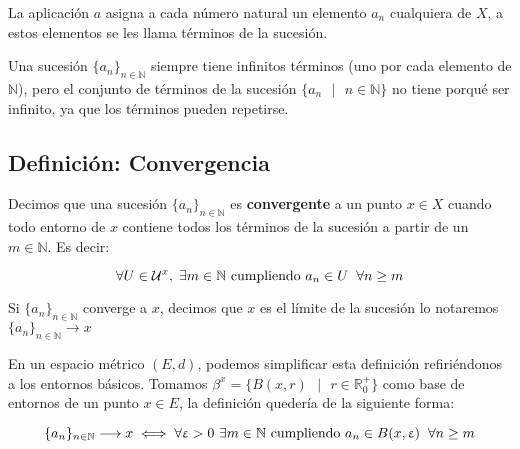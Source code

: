 \documentclass{article}
\begin{document}
\begin{justify} La aplicación $a$ asigna a cada número natural un
  elemento $a_n$ cualquiera de $X$, a estos elementos se les llama
  términos de la sucesión.
\end{justify}

\begin{justify} Una sucesión $\{a_n\}_{n \in \mathbb{N}}$ siempre
  tiene infinitos términos (uno por cada elemento de $\mathbb{N}$),
  pero el conjunto de términos de la sucesión
  $\{a_n \text{ } | \text{ } n \in \mathbb{N}\}$ no tiene porqué ser
  infinito, ya que los términos pueden repetirse.
\end{justify}

\subsection*{Definición: Convergencia}

\begin{justify} Decimos que una sucesión $\{a_n\}_{n \in \mathbb{N}}$
  es \textbf{convergente} a un punto $x \in X$ cuando todo entorno de
  $x$ contiene todos los términos de la sucesión a partir de un
  $m \in \mathbb{N}$. Es decir: \vspace{-1mm}

  \[\forall U \in \mathcal{U}^x, \hspace{1mm} \exists m \in \mathbb{N}
    \text{ cumpliendo } a_n \in U \hspace{2mm} \forall n \geq m \]
\end{justify}

\begin{justify} Si $\{a_n\}_{n \in \mathbb{N}}$ converge a $x$,
  decimos que $x$ es el límite de la sucesión lo notaremos $\{a_n\}_{n
    \in \mathbb{N}} \longrightarrow x$
\end{justify}

\begin{justify} En un espacio métrico $(E, d)$, podemos simplificar
  esta definición refiriéndonos a los entornos básicos. Tomamos $\beta^x
  = \{B(x,r) \text{ } | \text{ } r \in \mathbb{R}^+_0\}$ como base de
  entornos de un punto $x \in E$, la definición quedería de la siguiente
  forma:

  \[\{a_n\}_{n \in \mathbb{N}} \longrightarrow x \iff \forall
    \upvarepsilon > 0 \text{ } \exists m \in \mathbb{N} \text{ cumpliendo
    } a_n \in B(x, \upvarepsilon) \hspace{2mm} \forall n \geq m\]
\end{justify}
\end{document}
